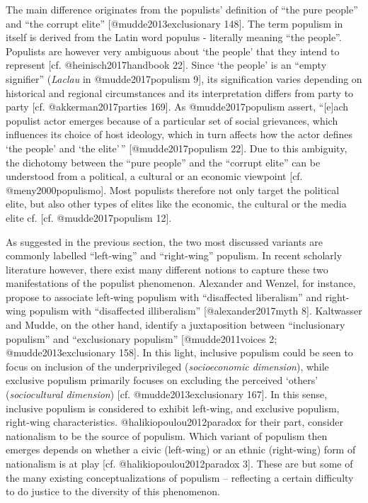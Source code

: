 \documentclass[]{article}
\begin{document}
The main difference originates from the populists' definition of ``the
pure people'' and ``the corrupt elite'' {[}@mudde2013exclusionary
148{]}. The term populism in itself is derived from the Latin word
populus - literally meaning ``the people''. Populists are however very
ambiguous about `the people' that they intend to represent {[}cf.
@heinisch2017handbook 22{]}. Since `the people' is an ``empty
signifier'' (\emph{Laclau} in @mudde2017populism 9{]}, its signification
varies depending on historical and regional circumstances and its
interpretation differs from party to party {[}cf. @akkerman2017parties
169{]}. As @mudde2017populism assert, ``{[}e{]}ach populist actor
emerges because of a particular set of social grievances, which
influences its choice of host ideology, which in turn affects how the
actor defines `the people' and `the elite'\,'' {[}@mudde2017populism
22{]}. Due to this ambiguity, the dichotomy between the ``pure people''
and the ``corrupt elite'' can be understood from a political, a cultural
or an economic viewpoint {[}cf. @meny2000populismo{]}. Most populists
therefore not only target the political elite, but also other types of
elites like the economic, the cultural or the media elite cf. {[}cf.
@mudde2017populism 12{]}.

As suggested in the previous section, the two most discussed variants
are commonly labelled ``left-wing'' and ``right-wing'' populism. In
recent scholarly literature however, there exist many different notions
to capture these two manifestations of the populist phenomenon.
Alexander and Wenzel, for instance, propose to associate left-wing
populism with ``disaffected liberalism'' and right-wing populism with
``disaffected illiberalism'' {[}@alexander2017myth 8{]}. Kaltwasser and
Mudde, on the other hand, identify a juxtaposition between
``inclusionary populism'' and ``exclusionary populism''
{[}@mudde2011voices 2; @mudde2013exclusionary 158{]}. In this light,
inclusive populism could be seen to focus on inclusion of the
underprivileged (\emph{socioeconomic dimension}), while exclusive
populism primarily focuses on excluding the perceived `others'
(\emph{sociocultural dimension}) {[}cf. @mudde2013exclusionary 167{]}.
In this sense, inclusive populism is considered to exhibit left-wing,
and exclusive populism, right-wing characteristics.
@halikiopoulou2012paradox for their part, consider nationalism to be the
source of populism. Which variant of populism then emerges depends on
whether a civic (left-wing) or an ethnic (right-wing) form of
nationalism is at play {[}cf. @halikiopoulou2012paradox 3{]}. These are
but some of the many existing conceptualizations of populism --
reflecting a certain difficulty to do justice to the diversity of this
phenomenon.
\end{document}
